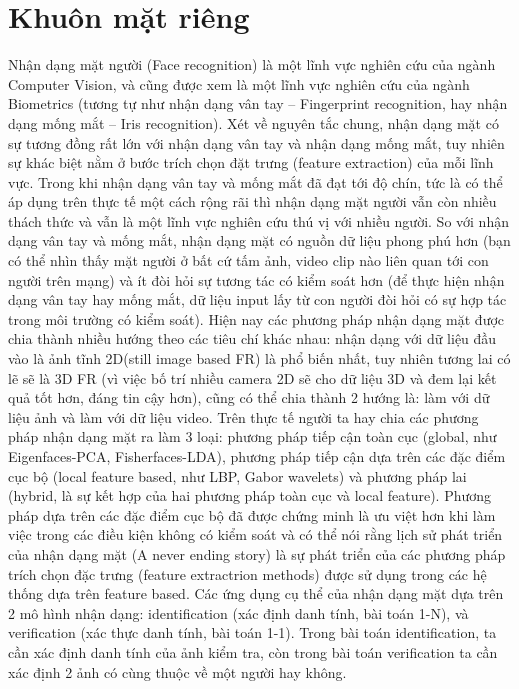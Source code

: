 \section{Khuôn mặt riêng}
Nhận dạng mặt người (Face recognition) là một lĩnh vực nghiên cứu của ngành Computer Vision, và cũng được xem là một lĩnh vực nghiên cứu của ngành Biometrics (tương tự như nhận dạng vân tay – Fingerprint recognition, hay nhận dạng mống mắt – Iris recognition). Xét về nguyên tắc chung, nhận dạng mặt có sự tương đồng rất lớn với nhận dạng vân tay và nhận dạng mống mắt, tuy nhiên sự khác biệt nằm ở bước trích chọn đặt trưng (feature extraction) của mỗi lĩnh vực. Trong khi nhận dạng vân tay và mống mắt đã đạt tới độ chín, tức là có thể áp dụng trên thực tế một cách rộng rãi thì nhận dạng mặt người vẫn còn nhiều thách thức và vẫn là một lĩnh vực nghiên cứu thú vị với nhiều người. So với nhận dạng vân tay và mống mắt, nhận dạng mặt có nguồn dữ liệu phong phú hơn (bạn có thể nhìn thấy mặt người ở bất cứ tấm ảnh, video clip nào liên quan tới con người trên mạng) và ít đòi hỏi sự tương tác có kiểm soát hơn (để thực hiện nhận dạng vân tay hay mống mắt, dữ liệu input lấy từ con người đòi hỏi có sự hợp tác trong môi trường có kiểm soát). Hiện nay các phương pháp nhận dạng mặt được chia thành nhiều hướng theo các tiêu chí khác nhau: nhận dạng với dữ liệu đầu vào là ảnh tĩnh 2D(still image based FR) là phổ biến nhất, tuy nhiên tương lai có lẽ sẽ là 3D FR (vì việc bố trí nhiều camera 2D sẽ cho dữ liệu 3D và đem lại kết quả tốt hơn, đáng tin cậy hơn), cũng có thể chia thành 2 hướng là: làm với dữ liệu ảnh và làm với dữ liệu video. Trên thực tế người ta hay chia các phương pháp nhận dạng mặt ra làm 3 loại: phương pháp tiếp cận toàn cục (global, như Eigenfaces-PCA, Fisherfaces-LDA), phương pháp tiếp cận dựa trên các đặc điểm cục bộ (local feature based, như LBP, Gabor wavelets) và phương pháp lai (hybrid, là sự kết hợp của hai phương pháp toàn cục và local feature). Phương pháp dựa trên các đặc điểm cục bộ đã được chứng minh là ưu việt hơn khi làm việc trong các điều kiện không có kiểm soát và có thể nói rằng lịch sử phát triển của nhận dạng mặt (A never ending story) là sự phát triển của các phương pháp trích chọn đặc trưng (feature extractrion methods) được sử dụng trong các hệ thống dựa trên feature based. Các ứng dụng cụ thể của nhận dạng mặt dựa trên 2 mô hình nhận dạng: identification (xác định danh tính, bài toán 1-N), và verification (xác thực danh tính, bài toán 1-1). Trong bài toán identification, ta cần xác định danh tính của ảnh kiểm tra, còn trong bài toán verification ta cần xác định 2 ảnh có cùng thuộc về một người hay không.

